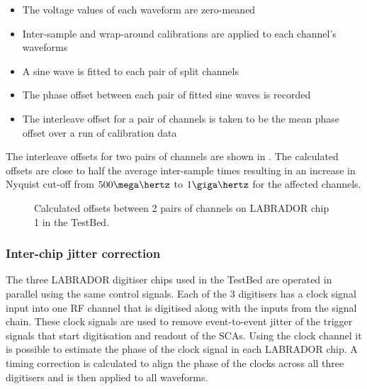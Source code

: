 \begin{itemize}
\item The voltage values of each waveform are zero-meaned
\item Inter-sample and wrap-around calibrations are applied to each channel's waveforms
\item A sine wave is fitted to each pair of split channels
\item The phase offset between each pair of fitted sine waves is recorded
\item The interleave offset for a pair of channels is taken to be the mean phase offset over a run of calibration data
\end{itemize}

The interleave offsets for two pairs of channels are shown in . The calculated offsets are close to half the average inter-sample times resulting in an increase in Nyquist cut-off from $500 \mega\hertz$ to $1\giga\hertz$ for the affected channels.

\begin{figure}[htpb]
  \hfill
  \caption{Calculated offsets between 2 pairs of channels on LABRADOR chip 1 in the TestBed.}
  \label{fig:calibration:LABRADOR-Digitiser-Chip:Interleave}
\end{figure}



\subsubsection{Inter-chip jitter correction}
\label{sec:calibration:LABRADOR-Digitiser-Chip:Inter-chip-jitter-correction}

The three LABRADOR digitiser chips used in the TestBed are operated in parallel using the same control signals. Each of the 3 digitisers has a clock signal input into one RF channel that is digitised along with the inputs from the signal chain. These clock signals are used to remove event-to-event jitter of the trigger signals that start digitisation and readout of the SCAs. Using the clock channel it is possible to estimate the phase of the clock signal in each LABRADOR chip. A timing correction is calculated to align the phase of the clocks across all three digitisers and is then applied to all waveforms.

